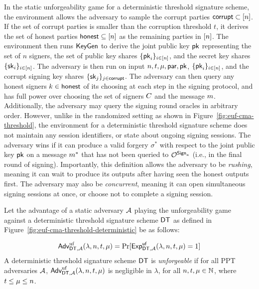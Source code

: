In the static unforgeability game for a deterministic threshold signature scheme,
the environment allows the adversary to sample the corrupt parties $\mathsf{corrupt} \subset [n]$.
If the set of corrupt parties is smaller than the corruption threshold $t$,
it derives the set of honest parties $\mathsf{honest} \subseteq [n]$ as the remaining parties in $[n]$.
The environment then runs $\mathsf{KeyGen}$ to derive the joint public key $\mathsf{pk}$ representing the set of $n$ signers,
the set of public key shares $\{ \mathsf{pk}_i \}_{i \in [n]}$,
and the secret key shares $ \{ \mathsf{sk}_i \}_{i \in [n]}$.
The adversary is then run on input $n, t, \mu, \mathsf{par}, \mathsf{pk}$, $\{ \mathsf{pk}_i \}_{i \in [n]}$,
and the corrupt signing key shares $ \{ \mathsf{sk}_j \}_{j \in \mathsf{corrupt}}$.
%
The adversary can then query any honest signers $k \in \mathsf{honest}$ of its choosing at each step in the signing protocol,
and has full power over choosing the set of signers $C$ and the message $m$.
Additionally, the adversary may query the signing round oracles in arbitrary order.
However,
unlike in the randomized setting as shown in Figure~\ref{fig:euf-cma-threshold},
the environment for a deterministic threshold signature scheme does not maintain any session identifiers,
or state about ongoing signing sessions.
%
The adversary wins if it can produce a valid forgery $\sigma^*$ with
respect to the joint public key $\mathsf{pk}$ on a message $m^*$ that has not been queried to $\mathcal{O}^{\mathsf{Sign}_\kappa}$ (i.e., in the final round of signing).
%
Importantly, this definition allows the adversary to be \emph{rushing},
meaning it can wait to produce its outputs after having seen the honest outputs first.
The adversary may also be \emph{concurrent},
meaning it can open simultaneous signing sessions at once,
or choose not to complete a signing session.

\begin{definition}[Unforgeability]
Let the advantage of a static adversary $\mathcal{A}$ playing the unforgeability game
  against a deterministic threshold signature scheme $\mathsf{DT}$ as defined in Figure~\ref{fig:euf-cma-threshold-deterministic} be as follows:

\[
  \textsf{\upshape Adv}^{\textrm{\upshape uf}}_{\mathsf{DT}, \mathcal{A}}(\lambda, n, t,\mu) = \Pr[ \textsf{\upshape Exp}^{\textsf{\upshape uf}}_{\mathsf{DT},\mathcal{A}}(\lambda,n,t,\mu)= 1]
\]
%
A deterministic threshold signature scheme $\mathsf{DT}$ is \emph{unforgeable} if for all PPT adversaries $\mathcal{A}$,
$\textsf{\upshape Adv}^{\textrm{\upshape uf}}_{\mathsf{DT},\mathcal{A}}(\lambda, n, t,\mu) $ is negligible
in $\lambda$,
for all $n, t,\mu \in \mathbb{N}$,
where $t \leq \mu \leq n$.
\end{definition}
